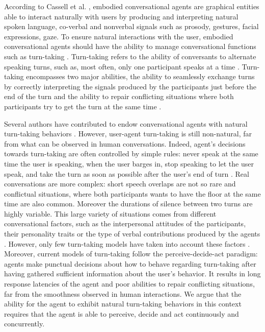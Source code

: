 According to Cassell et al. \cite{cassell_embodiment_1999}, embodied conversational agents are graphical entities able to interact naturally with users by producing and interpreting natural spoken language, co-verbal and nonverbal signals such as prosody, gestures, facial expressions, gaze. 
To ensure natural interactions with the user, embodied conversational agents should have the ability to manage conversational functions such as turn-taking \citep{cassell_embodiment_1999}. Turn-taking refers to the ability of conversants to alternate speaking turns, such as, most often, only one participant speaks at a time \citep{sacks_simplest_1974}. Turn-taking encompasses two major abilities, the ability to seamlessly exchange turns by correctly interpreting the signals produced by the participants just before the end of the turn
and the ability to repair conflicting situations where both participants try to get the turn at the same time \citep{thorisson_natural_2002}. 

Several authors have contributed to endow conversational agents with natural turn-taking behaviors \citep{thorisson_natural_2002,raux_optimizing_2012,jonsdottir_distributed_2013}. However, user-agent turn-taking is still non-natural, far from what can be observed in human conversations. Indeed, agent's decisions towards turn-taking are often controlled by simple rules: never speak at the same time the user is speaking, when the user barges in, stop speaking to let the user speak, and take the turn as soon as possible after the user's end of turn \citep{ter_maat_how_2010}. Real conversations are more complex: short speech overlaps are not so rare and conflictual situations, where both participants wants to have the floor at the same time are also common. Moreover the durations of silence between two turns are highly variable. This large variety of situations comes from different conversational factors, such as the interpersonal attitudes of the participants, their personality traits \citep{ter_maat_how_2010} or the type of verbal contributions produced by the agents \citep{cafaro_effects_2016}. However, only few turn-taking models have taken into account these factors \citep{lessmann_towards_2004,ravenet_conversational_2015}.
Moreover, current models of turn-taking follow the perceive-decide-act paradigm: agents make punctual decisions about how to behave regarding turn-taking after having gathered sufficient information about the user's behavior. It results in long response latencies of the agent and poor abilities to repair conflicting situations, far from the smoothness observed in human interactions. We argue that the ability for the agent to exhibit natural turn-taking behaviors in this context requires that the agent is able to perceive, decide and act continuously and concurrently.  

